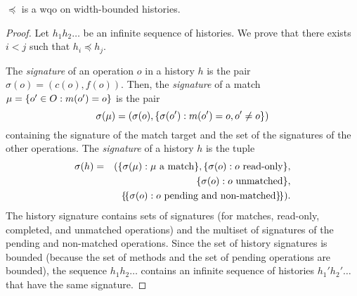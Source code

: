 \begin{lemma}

  $\preceq$ is a wqo on width-bounded histories.

\end{lemma}

\begin{proof}

%
%

Let $h_1 h_2\ldots $ be an infinite sequence of histories. We prove that there exists $i<j$ such that $h_i\preceq h_j$.

The \emph{signature} of an operation $o$ in a history $h$ is the pair $\sigma(o)=(c(o),f(o))$.
Then, the \emph{signature} of a match $\mu={\{{ o' \in O : m(o') = o}\}}$ is the pair
\[
\sigma(\mu)=(\sigma(o),{\{{\sigma(o') : m(o')=o, o'\neq o}\}})
\]
containing the signature of the match target and the set of the signatures of the other operations.
The \emph{signature} of a history $h$ is the tuple
\begin{align*}
\sigma(h)&=&({\{{\sigma(\mu): \mu\mbox{ a match}}\}}, {\{{\sigma(o): o\mbox{ read-only}}\}}, \\
&& {\{{\sigma(o): o\mbox{ unmatched}}\}}, \\
&& {\{\!\{ \sigma(o): o\mbox{ pending and non-matched} \}\!\}}).
\end{align*}
The history signature contains sets of signatures (for matches, read-only,
completed, and unmatched operations) and the multiset of signatures of the
pending and non-matched operations.
Since the set of history signatures is bounded (because the set of methods
and the set of pending operations are bounded),
the sequence $h_1 h_2\ldots $ contains an infinite sequence of histories $h_1' h_2' \ldots$ that have
the same signature.


\end{proof}
